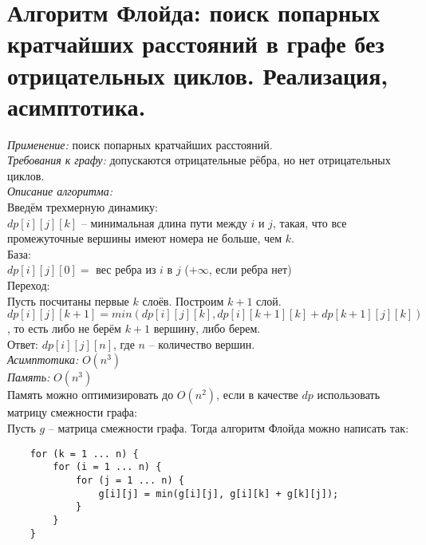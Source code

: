 \setcounter{section}{53}
\section{Алгоритм Флойда: поиск попарных кратчайших расстояний в графе без отрицательных циклов. Реализация, асимптотика.}
    
    \textit{Применение: } поиск попарных кратчайших расстояний.\\
    
    \textit{Требования к графу: } допускаются отрицательные рёбра, но нет отрицательных циклов.\\
    
    \textit{Описание алгоритма: }\\
    
    Введём трехмерную динамику:\\
    $dp[i][j][k]$ -- минимальная длина пути между $i$ и $j$, такая, что все промежуточные вершины имеют номера не больше, чем $k$.\\
    
    База:\\
    $dp[i][j][0] = $ вес ребра из $i$ в $j$ ($+\infty$, если ребра нет)\\
    
    Переход:\\
    Пусть посчитаны первые $k$ слоёв. Построим $k + 1$ слой.\\
    $dp[i][j][k + 1] = min(dp[i][j][k], dp[i][k + 1][k] + dp[k + 1][j][k])$, то есть либо не берём $k + 1$ вершину, либо берем.\\
    
    Ответ: $dp[i][j][n]$, где $n$ -- количество вершин.\\
    
    \textit{Асимптотика: } $O(n^3)$\\
    \textit{Память: } $O(n^3)$\\
    
    Память можно оптимизировать до $O(n^2)$, если в качестве $dp$ использовать матрицу смежности графа:\\
    
    Пусть $g$ -- матрица смежности графа. Тогда алгоритм Флойда можно написать так:
    
    \begin{lstlisting}
    for (k = 1 ... n) {
        for (i = 1 ... n) {
            for (j = 1 ... n) {
                g[i][j] = min(g[i][j], g[i][k] + g[k][j]);
            }
        }
    }
    \end{lstlisting}
    
